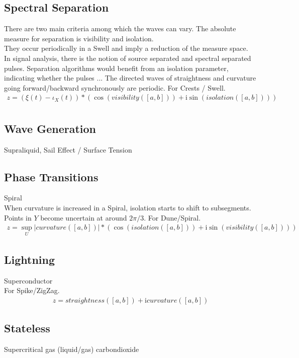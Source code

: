 \documentclass{report}
\begin{document}
\subsection{Spectral Separation}
There are two main criteria among which the waves can vary. The absolute measure for separation is visibility and isolation.\\
They occur periodically in a Swell and imply a reduction of the measure space.\\
In signal analysis, there is the notion of source separated and spectral separated pulses. Separation algorithms would benefit from an isolation parameter, indicating whether the pulses ...
The directed waves of straightness and curvature going forward/backward synchronously are periodic.
For Crests / Swell.
\begin{align}
z =  (\xi(t)-\iota_{X}(t))*(\cos{(visibility([a,b]))} +\mathrm{i} \sin{(isolation([a,b]))})\\
\end{align}

\subsection{Wave Generation}
Supraliquid, Sail Effect / Surface Tension
\subsection{Phase Transitions}
Spiral\\
When curvature is increased in a Spiral, isolation starts to shift to subsegments. Points in $Y$ become uncertain at around $2\pi/3$.
For Dune/Spiral.
\begin{align}
z =  \sup_{U}\lvert curvature([a,b]) \rvert*(\cos{(isolation([a,b]))} +\mathrm{i} \sin{(visibility([a,b]))})
\end{align}

\subsection{Lightning}
Superconductor\\
For Spike/ZigZag.
\begin{align}
z =  straightness([a,b]) + \mathrm{i} curvature([a,b])
\end{align}

\subsection{Stateless}
Supercritical gas (liquid/gas) carbondioxide

\printbibliography
\end{document}
